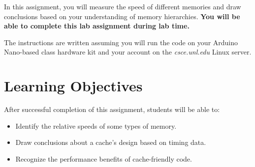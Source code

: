 


\usepackage{graphicx}

\usepackage{xparse}
\usepackage{tikz}
\usetikzlibrary{shadows}
\usepackage{lipsum}


\NewDocumentCommand{}

\renewcommand{\labnumber}{11}
\renewcommand{\labname}{Memory Measurement Lab}
\renewcommand{\shortlabname}{memorylab}
\renewcommand{\collaborationrules}{This is an individual-effort project. You
may discuss the nature of memory technologies and of memory hierarchies with
classmates, but you must draw your own conclusions.}
\renewcommand{\duedate}{Week of May 2, at the end of your lab section}
\newcommand{\nano}{Arduino Nano}
\renewcommand{\runtimeenvironment}{your \nano-based class hardware kit and your
account on the \textit{csce.unl.edu} Linux server}
\startdocument


In this assignment, you will measure the speed of different memories and draw
conclusions based on your understanding of memory hierarchies. \textbf{You will
be able to complete this lab assignment during lab time.}

The instructions are written assuming you will run the code on
\runtimeenvironment.

\section*{Learning Objectives}

After successful completion of this assignment, students will be able to:
\begin{itemize}
\item Identify the relative speeds of some types of memory.
\item Draw conclusions about a cache's design based on timing data.
\item Recognize the performance benefits of cache-friendly code.
\end{itemize}

